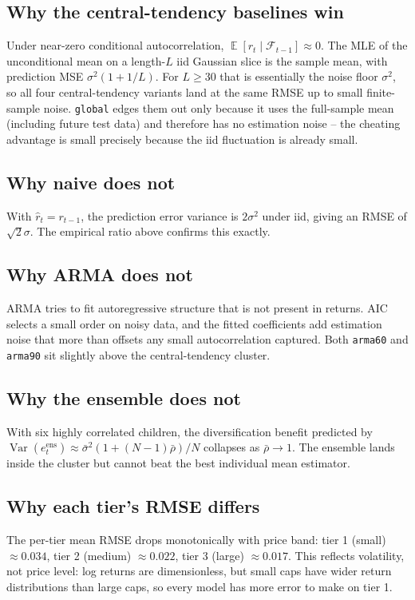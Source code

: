 \documentclass[10pt,a4paper,twocolumn]{article}
\DeclareMathOperator{\Var}{Var}
\DeclareMathOperator{\E}{\mathbb{E}}
\begin{document}
\subsection{Why the central-tendency baselines win}
Under near-zero conditional autocorrelation, $\E[r_t \mid \mathcal{F}_{t-1}] \approx 0$. The MLE of the unconditional mean on a length-$L$ iid Gaussian slice is the sample mean, with prediction MSE $\sigma^2(1 + 1/L)$. For $L \ge 30$ that is essentially the noise floor $\sigma^2$, so all four central-tendency variants land at the same RMSE up to small finite-sample noise. \texttt{global} edges them out only because it uses the full-sample mean (including future test data) and therefore has no estimation noise -- the cheating advantage is small precisely because the iid fluctuation is already small.

\subsection{Why naive does not}
With $\hat r_t = r_{t-1}$, the prediction error variance is $2\sigma^2$ under iid, giving an RMSE of $\sqrt{2}\sigma$. The empirical ratio above confirms this exactly.

\subsection{Why ARMA does not}
ARMA tries to fit autoregressive structure that is not present in returns. AIC selects a small order on noisy data, and the fitted coefficients add estimation noise that more than offsets any small autocorrelation captured. Both \texttt{arma60} and \texttt{arma90} sit slightly above the central-tendency cluster.

\subsection{Why the ensemble does not}
With six highly correlated children, the diversification benefit predicted by $\Var(e_t^{\text{ens}}) \approx \bar\sigma^2 (1 + (N-1)\bar\rho)/N$ collapses as $\bar\rho \to 1$. The ensemble lands inside the cluster but cannot beat the best individual mean estimator.

\subsection{Why each tier's RMSE differs}
The per-tier mean RMSE drops monotonically with price band: tier 1 (small) $\approx 0.034$, tier 2 (medium) $\approx 0.022$, tier 3 (large) $\approx 0.017$. This reflects volatility, not price level: log returns are dimensionless, but small caps have wider return distributions than large caps, so every model has more error to make on tier 1.
\end{document}
